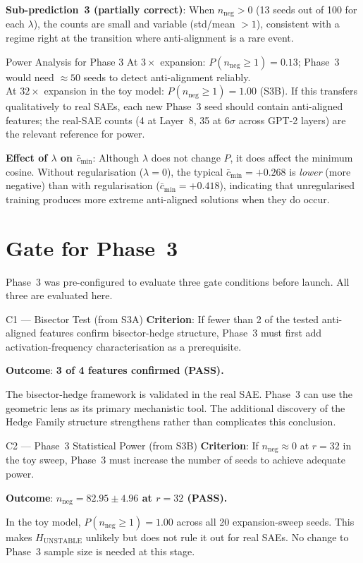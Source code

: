 \documentclass[11pt,a4paper]{article}
\newcommand{\nneg}{n_{\mathrm{neg}}}
\newcommand{\mcos}{\bar{c}_{\min}}
\begin{document}
\textbf{Sub-prediction~3 (partially correct)}: When $\nneg{>}0$ (13 seeds out of 100
for each $\lambda$), the counts are small and variable (std/mean $> 1$), consistent
with a regime right at the transition where anti-alignment is a rare event.

\begin{finding}{Power Analysis for Phase 3}
At $3\times$ expansion: $P(\nneg{\ge}1){=}0.13$; Phase~3 would need ${\approx}50$
seeds to detect anti-alignment reliably. \\
At $32\times$ expansion in the toy model: $P(\nneg{\ge}1){=}1.00$ (S3B).
If this transfers qualitatively to real SAEs, each new Phase~3 seed should contain
anti-aligned features; the real-SAE counts (4 at Layer~8, 35 at $6\sigma$ across GPT-2
layers) are the relevant reference for power.
\end{finding}

\textbf{Effect of $\lambda$ on $\mcos$}: Although $\lambda$ does not change $P$,
it does affect the minimum cosine.  Without regularisation ($\lambda{=}0$),
the typical $\mcos{=}+0.268$ is \emph{lower} (more negative) than with regularisation
($\mcos{=}+0.418$), indicating that unregularised training produces more extreme
anti-aligned solutions when they do occur.

\section{Gate for Phase~3}
\label{sec:gate}

Phase~3 was pre-configured to evaluate three gate conditions before launch.
All three are evaluated here.

\begin{gatebox}{C1 --- Bisector Test (from S3A)}
\textbf{Criterion}: If fewer than 2 of the tested anti-aligned features confirm
bisector-hedge structure, Phase~3 must first add activation-frequency characterisation
as a prerequisite.

\textbf{Outcome}: \textbf{3 of 4 features confirmed (PASS).}

The bisector-hedge framework is validated in the real SAE.
Phase~3 can use the geometric lens as its primary mechanistic tool.
The additional discovery of the Hedge Family structure strengthens rather than
complicates this conclusion.
\end{gatebox}

\begin{gatebox}{C2 --- Phase~3 Statistical Power (from S3B)}
\textbf{Criterion}: If $\nneg \approx 0$ at $r{=}32$ in the toy sweep, Phase~3
must increase the number of seeds to achieve adequate power.

\textbf{Outcome}: \textbf{$\nneg = 82.95\pm4.96$ at $r{=}32$ (PASS).}

In the toy model, $P(\nneg{\ge}1){=}1.00$ across all 20 expansion-sweep seeds.
This makes $H_{\mathrm{UNSTABLE}}$ unlikely but does not rule it out for real SAEs.
No change to Phase~3 sample size is needed at this stage.
\end{gatebox}
\end{document}
